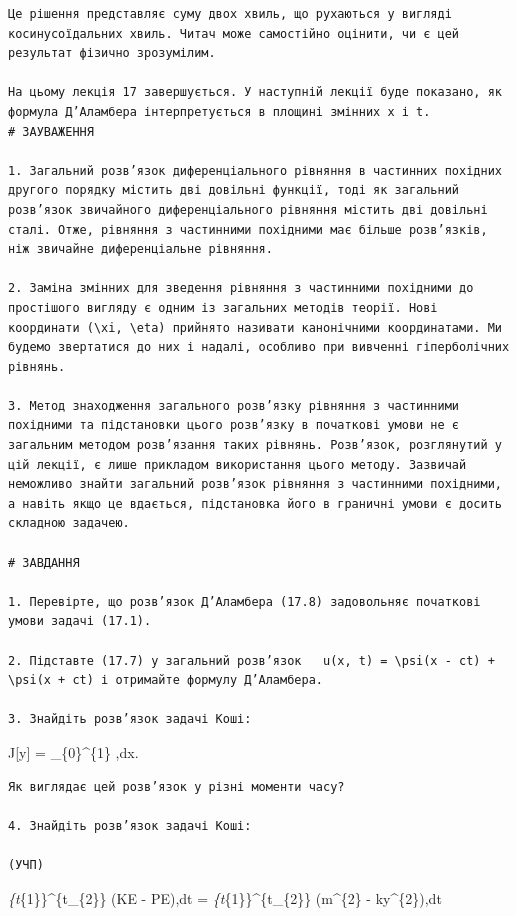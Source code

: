 \documentclass[
  ukrainian,
]{article}
\begin{document}
\begin{verbatim}
Це рішення представляє суму двох хвиль, що рухаються у вигляді косинусоїдальних хвиль. Читач може самостійно оцінити, чи є цей результат фізично зрозумілим.

На цьому лекція 17 завершується. У наступній лекції буде показано, як формула Д’Аламбера інтерпретується в площині змінних x і t.
# ЗАУВАЖЕННЯ

1. Загальний розв’язок диференціального рівняння в частинних похідних другого порядку містить дві довільні функції, тоді як загальний розв’язок звичайного диференціального рівняння містить дві довільні сталі. Отже, рівняння з частинними похідними має більше розв’язків, ніж звичайне диференціальне рівняння.

2. Заміна змінних для зведення рівняння з частинними похідними до простішого вигляду є одним із загальних методів теорії. Нові координати (\xi, \eta) прийнято називати канонічними координатами. Ми будемо звертатися до них і надалі, особливо при вивченні гіперболічних рівнянь.

3. Метод знаходження загального розв’язку рівняння з частинними похідними та підстановки цього розв’язку в початкові умови не є загальним методом розв’язання таких рівнянь. Розв’язок, розглянутий у цій лекції, є лише прикладом використання цього методу. Зазвичай неможливо знайти загальний розв’язок рівняння з частинними похідними, а навіть якщо це вдається, підстановка його в граничні умови є досить складною задачею.

# ЗАВДАННЯ

1. Перевірте, що розв’язок Д’Аламбера (17.8) задовольняє початкові умови задачі (17.1).

2. Підставте (17.7) у загальний розв’язок   u(x, t) = \psi(x - ct) + \psi(x + ct) і отримайте формулу Д’Аламбера.

3. Знайдіть розв’язок задачі Коші:
\end{verbatim}

J{[}y{]} = \int\_\{0\}\^{}\{1\} ,dx.

\begin{verbatim}
Як виглядає цей розв’язок у різні моменти часу?

4. Знайдіть розв’язок задачі Коші:

(УЧП)
\end{verbatim}

\int\emph{\{t}\{1\}\}\^{}\{t\_\{2\}\} (KE - PE),dt = 
\int\emph{\{t}\{1\}\}\^{}\{t\_\{2\}\} (m\^{}\{2\} -
ky\^{}\{2\}),dt
\end{document}
